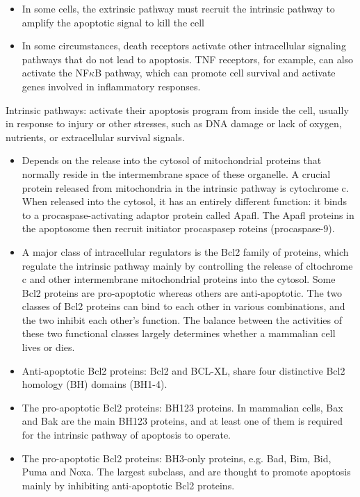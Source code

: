 \documentclass{report}
\begin{document}
\begin{enumerate}
\begin{itemize}
\item In some cells, the extrinsic pathway must recruit the intrinsic pathway to amplify the apoptotic signal to kill the cell

\item In some circumstances, death receptors activate other intracellular signaling pathways that do not lead to apoptosis. TNF receptors, for example, can also activate the NF$\kappa$B pathway, which can promote cell survival and activate genes involved in inflammatory responses. 
\end{itemize}

Intrinsic pathways: activate their apoptosis program from inside the cell, usually in response to injury or other stresses, such as DNA damage or lack of oxygen, nutrients, or extracellular survival signals. 
\begin{itemize}
\item Depends on the release into the cytosol of mitochondrial proteins that normally reside in the intermembrane space of these organelle. A crucial protein released from mitochondria in the intrinsic pathway is cytochrome c. When released into the cytosol, it has an entirely different function: it binds to a procaspase-activating adaptor protein called Apafl. The Apafl proteins in the apoptosome then recruit initiator procaspasep roteins (procaspase-9). 

\item A major class of intracellular regulators is the Bcl2 family of proteins, which regulate the intrinsic pathway mainly by controlling the release of cltochrome c and other intermembrane mitochondrial proteins into the cytosol. Some Bcl2 proteins are pro-apoptotic whereas others are anti-apoptotic. The two classes of Bcl2 proteins can bind to each other in various combinations, and the two inhibit each other's function. The balance between the activities of these two functional classes largely determines whether a mammalian cell lives or dies. 

\item Anti-apoptotic Bcl2 proteins: Bcl2 and BCL-XL, share four distinctive Bcl2 homology (BH) domains (BH1-4).

\item The pro-apoptotic Bcl2 proteins: BH123 proteins. In mammalian cells, Bax and Bak are the main BH123 proteins, and at least one of them is required for the intrinsic pathway of apoptosis to operate. 

\item The pro-apoptotic Bcl2 proteins: BH3-only proteins, e.g. Bad, Bim, Bid, Puma and Noxa. The largest subclass, and are thought to promote apoptosis mainly by inhibiting anti-apoptotic Bcl2 proteins.
 

\end{itemize}
\end{enumerate}
\end{document}
